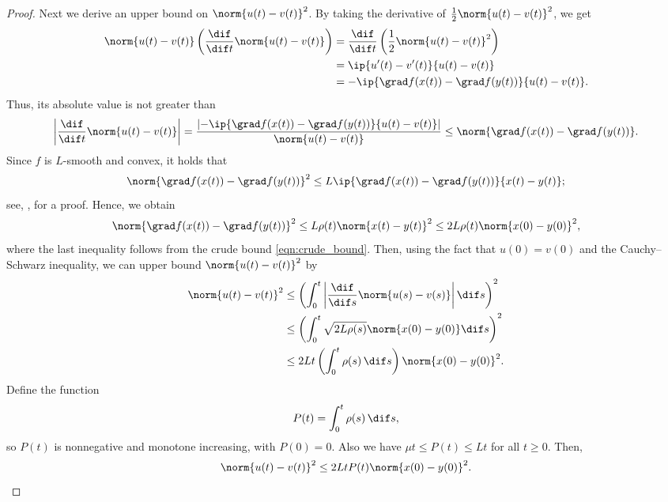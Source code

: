 \begin{proof}
	Next we derive an upper bound on $\norm{u(t)-v(t)}^2$. 
	By taking the derivative of $\frac{1}{2} \norm{u(t)-v(t)}^2$, we get
	\begin{align*}
		\norm{u(t)-v(t)} \left( \frac{\dif}{\dif t} \norm{u(t)-v(t)} \right) 
		&= \frac{\dif}{\dif t} \left( \frac{1}{2} \norm{u(t)-v(t)}^2 \right)\\ 
		&= \ip{u'(t)-v'(t)}{u(t)-v(t)}\\ 
		&= - \ip{\grad f(x(t)) - \grad f(y(t))}{u(t)-v(t)}.
	\end{align*}
Thus, its absolute value is 
%
not greater than  %
	\[
	\left| \frac{\dif}{\dif t} \norm{u(t)-v(t)} \right| = \frac{\left| - \ip{\grad f(x(t)) - \grad f(y(t))}{u(t)-v(t)} \right|}{\norm{u(t)-v(t)}} \le \norm{\grad f(x(t)) - \grad f(y(t))}.
	\]
	Since $f$ is $L$-smooth and convex, it holds that 
	\[
	\norm{\grad f(x(t)) - \grad f(y(t))}^2 \le L \ip{\grad f(x(t)) - \grad f(y(t))}{x(t)-y(t)}; 
	\] 
	see, \eg, \cite[Lemma 4]{Zhou18} for a proof. Hence, we obtain 
	\[
	\norm{\grad f(x(t)) - \grad f(y(t))}^2 
	\le L\rho(t) \norm{x(t)-y(t)}^2 \le 2L\rho(t) \norm{x(0)-y(0)}^2,
	\]
	where the last inequality follows from the crude bound \eqref{eqn:crude_bound}. 
Then, using the fact that $u(0)=v(0)$ and the Cauchy--Schwarz inequality, we can upper bound $\norm{u(t)-v(t)}^2$ by
	\begin{align*}
		\norm{u(t)-v(t)}^2 
		&\le \left( \int_{0}^t \left| \frac{\dif}{\dif s} \norm{u(s)-v(s)} \right| \dif s \right)^2\\ 
		&\le \left( \int_{0}^t \sqrt{2L\rho(s)} \norm{x(0)-y(0)} \dif s \right)^2\\ 
		&\le 2L t \left( \int_{0}^t \rho(s) \,\dif s \right) \norm{x(0)-y(0)}^2. 
	\end{align*}
	Define the function
	\[
	P(t) = \int_{0}^t \rho(s) \,\dif s,
	\]
	so $P(t)$ is nonnegative and monotone increasing, with $P(0) = 0$. Also we have $\mu t \le P(t) \le Lt$ for all $t\geq 0$. Then, 
	\begin{equation}\label{eqn:bound_u-v}
	\norm{u(t)-v(t)}^2 \le 2Lt P(t) \norm{x(0)-y(0)}^2.
	\end{equation}
	

\end{proof}
